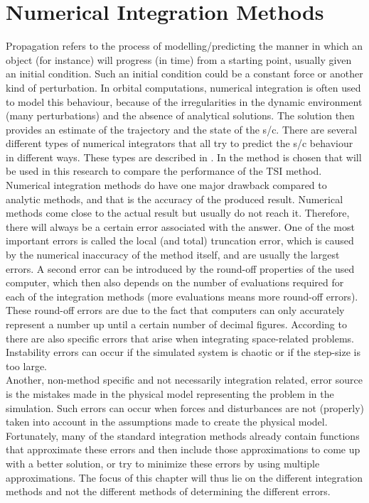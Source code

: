 \chapter{Numerical Integration Methods}


\label{ch:standardIntegrationMethods}
Propagation refers to the process of modelling/predicting the manner in which an object (for instance) will progress (in time) from a starting point, usually given an initial condition. Such an initial condition could be a constant force or another kind of perturbation. In orbital computations, numerical integration is often used to model this behaviour, because of the irregularities in the dynamic environment (many perturbations) and the absence of analytical solutions. The solution then provides an estimate of the trajectory and the state of the \ac{s/c}\citep{hofsteenge2013}. There are several different types of numerical integrators that all try to predict the \ac{s/c} behaviour in different ways. These types are described in . In  the method is chosen that will be used in this research to compare the performance of the \ac{TSI} method. \\
Numerical integration methods do have one major drawback compared to analytic methods, and that is the accuracy of the produced result. Numerical methods come close to the actual result but usually do not reach it. Therefore, there will always be a certain error associated with the answer. One of the most important errors is called the local (and total) truncation error, which is caused by the numerical inaccuracy of the method itself, and are usually the largest errors. A second error can be introduced by the round-off properties of the used computer, which then also depends on the number of evaluations required for each of the integration methods (more evaluations means more round-off errors). These round-off errors are due to the fact that computers can only accurately represent a number up until a certain number of decimal figures. According to \cite{milani1987} there are also specific errors that arise when integrating space-related problems. Instability errors can occur if the simulated system is chaotic or if the step-size is too large.\\
Another, non-method specific and not necessarily integration related, error source is the mistakes made in the physical model representing the problem in the simulation. Such errors can occur when forces and disturbances are not (properly) taken into account in the assumptions made to create the physical model.\\
Fortunately, many of the standard integration methods already contain functions that approximate these errors and then include those approximations to come up with a better solution, or try to minimize these errors by using multiple approximations. The focus of this chapter will thus lie on the different integration methods and not the different methods of determining the different errors.

